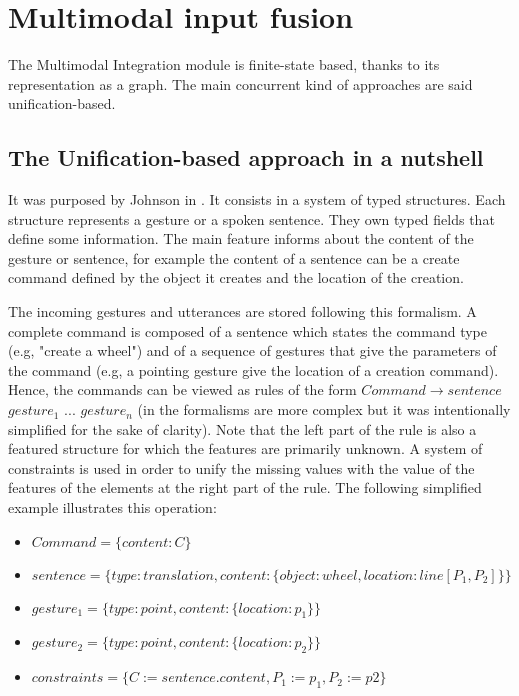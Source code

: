 \documentclass[a4paper]{article}
\begin{document}
\section{Multimodal input fusion}

The Multimodal Integration module is finite-state based, thanks to its representation as a graph. The main concurrent kind of approaches are said unification-based.

\subsection{The Unification-based approach in a nutshell}
It was purposed by Johnson in \cite{unification-based}. It consists in a system of typed structures. Each structure represents a gesture or a spoken sentence. They own typed fields that define some information. The main feature informs about the content of the gesture or sentence, for example the content of a sentence can be a create command defined by the object it creates and the location of the creation.

The incoming gestures and utterances are stored following this formalism. A complete command is composed of a sentence which states the command type (e.g, "create a wheel") and of a sequence of gestures that give the parameters of the command (e.g, a pointing gesture give the location of a creation command). Hence, the commands can be viewed as rules of the form $Command \rightarrow sentence$ $gesture_1$ $...$ $gesture_n$ (in \cite{unification-based} the formalisms are more complex but it was intentionally simplified for the sake of clarity). Note that the left part of the rule is also a featured structure for which the features are primarily unknown. A system of constraints is used in order to unify the missing values with the value of the features of the elements at the right part of the rule. The following simplified example illustrates this operation:

\begin{itemize}
	\item $Command = \lbrace content: C \rbrace$ 
	\item $sentence = \lbrace type: translation, content: \lbrace object: wheel, location: line[P_1, P_2] \rbrace\rbrace$
	\item $gesture_1 = \lbrace type: point, content: \lbrace location: p_1 \rbrace\rbrace$
	\item $gesture_2 = \lbrace type: point, content: \lbrace location: p_2 \rbrace\rbrace$
	\item $constraints = \lbrace C := sentence.content, P_1 := p_1, P_2 := p2 \rbrace$
\end{itemize}
\end{document}
